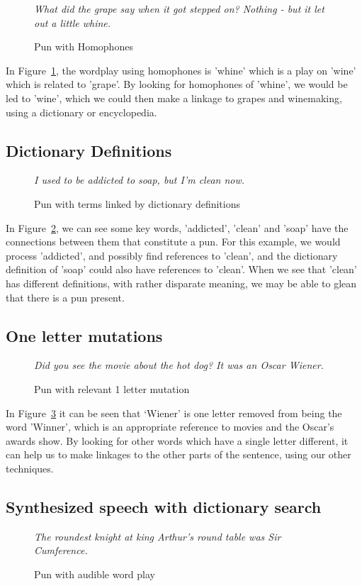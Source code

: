 \begin{figure}[h]
  \caption{Pun with Homophones}
  \emph{What did the grape say when it got stepped on? Nothing - but it let out a little whine.}
 \label{punhomophone}
\end{figure}

In Figure~\ref{punhomophone}, the wordplay using homophones is 'whine' which is a play on 'wine' which is related to 'grape'. By looking for homophones of 'whine', we would be led to 'wine', which we could then make a linkage to grapes and winemaking, using a dictionary or encyclopedia.

\subsection{Dictionary Definitions}

\begin{figure}[h]
  \caption{Pun with terms linked by dictionary definitions}
  \emph{I used to be addicted to soap, but I'm clean now.}
 \label{addicted}
\end{figure}

In Figure~\ref{addicted}, we can see some key words, 'addicted', 'clean' and 'soap' have the connections between them that constitute a pun. For this example, we would process 'addicted', and possibly find references to 'clean', and the dictionary definition of 'soap' could also have references to 'clean'. When we see that 'clean' has different definitions, with rather disparate meaning, we may be able to glean that there is a pun present.

\subsection{One letter mutations}

\begin{figure}[h]
  \caption{Pun with relevant 1 letter mutation}
  \emph{Did you see the movie about the hot dog? It was an Oscar Wiener.}
 \label{punmutation}
\end{figure}

In Figure~\ref{punmutation} it can be seen that `Wiener'  is one letter removed from being the word 'Winner', which is an appropriate reference to movies and the Oscar's awards show. By looking for other words which have a single letter different, it can help us to make linkages to the other parts of the sentence, using our other techniques.

\subsection{Synthesized speech with dictionary search}
\begin{figure}[h]
  \caption{Pun with audible word play}
  \emph{The roundest knight at king Arthur's round table was Sir Cumference.}
 \label{sircumference}
\end{figure}

